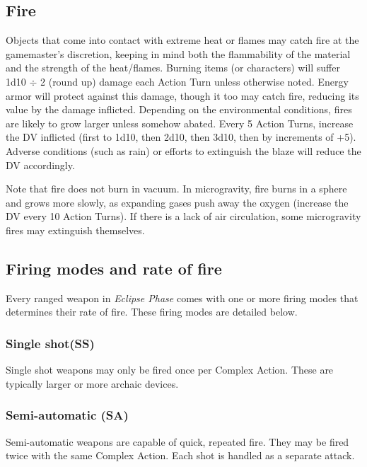 \subsection{Fire} \label{sec:fire} 

Objects that come into contact with extreme heat or flames may catch fire at the gamemaster’s discretion, keeping in mind both the flammability of the material and the strength of the heat/flames. Burning items (or characters) will suffer 1d10 $\div$ 2 (round up) damage each Action Turn unless otherwise noted. Energy armor will protect against this damage, though it too may catch fire, reducing its value by the damage inflicted. Depending on the environmental conditions, fires are likely to grow larger unless somehow abated. Every 5 Action Turns, increase the DV inflicted (first to 1d10, then 2d10, then 3d10, then by increments of +5). Adverse conditions (such as rain) or efforts to extinguish the blaze will reduce the DV accordingly. 

Note that fire does not burn in vacuum. In microgravity, fire burns in a sphere and grows more slowly, as expanding gases push away the oxygen (increase the DV every 10 Action Turns). If there is a lack of air circulation, some microgravity fires may extinguish themselves. 



\subsection{Firing modes and rate of fire} \label{sec:firing-modes-rate} 

Every ranged weapon in \emph{Eclipse Phase} comes with one or more firing modes that determines their rate of fire. These firing modes are detailed below. 

\subsubsection{Single shot(SS)} 

Single shot weapons may only be fired once per Complex Action. These are typically larger or more archaic devices. 

\subsubsection{Semi-automatic (SA)} 

Semi-automatic weapons are capable of quick, repeated fire. They may be fired twice with the same Complex Action. Each shot is handled as a separate attack. 


